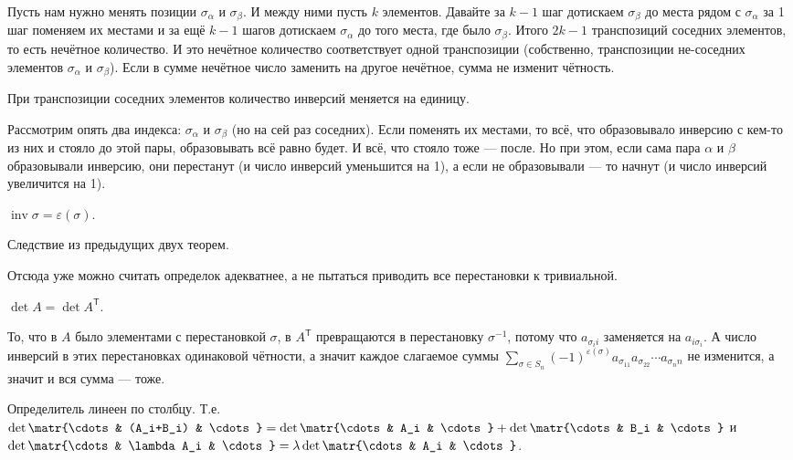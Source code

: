 \documentclass{article}
\newcommand*{\trans}{^{\mathsf T}}
\begin{document}
\begin{itemize}
        \begin{Proof}
            Пусть нам нужно менять позиции $\sigma_\alpha$ и $\sigma_\beta$. И между ними пусть $k$ элементов. Давайте за $k-1$ шаг дотискаем $\sigma_\beta$ до места рядом с $\sigma_\alpha$ за 1 шаг поменяем их местами и за ещё $k-1$ шагов дотискаем $\sigma_\alpha$ до того места, где было $\sigma_\beta$. Итого $2k-1$ транспозиций соседних элементов, то есть нечётное количество. И это нечётное количество соответствует одной транспозиции (собственно, транспозиции не-соседних элементов $\sigma_\alpha$ и $\sigma_\beta$). Если в сумме нечётное число заменить на другое нечётное, сумма не изменит чётность.
        \end{Proof}
        \thm При транспозиции соседних элементов количество инверсий меняется на единицу.
        \begin{Proof}
            Рассмотрим опять два индекса: $\sigma_\alpha$ и $\sigma_\beta$ (но на сей раз соседних). Если поменять их местами, то всё, что образовывало инверсию с кем-то из них и стояло до этой пары, образовывать всё равно будет. И всё, что стояло тоже --- после. Но при этом, если сама пара $\alpha$ и $\beta$ образовывали инверсию, они перестанут (и число инверсий уменьшится на 1), а если не образовывали --- то начнут (и число инверсий увеличится на 1).
        \end{Proof}
        \thm $\operatorname{inv}\sigma=\varepsilon(\sigma)$.
        \begin{Proof}
            Следствие из предыдущих двух теорем.
        \end{Proof}
        \begin{Comment}
            Отсюда уже можно считать определок адекватнее, а не пытаться приводить все перестановки к тривиальной.
        \end{Comment}
        \thm $\det A=\det A\trans$.
        \begin{Proof}
            То, что в $A$ было элементами с перестановкой $\sigma$, в $A\trans$ превращаются в перестановку $\sigma^{-1}$, потому что $a_{\sigma_ii}$ заменяется на $a_{i\sigma_i}$. А число инверсий в этих перестановках одинаковой чётности, а значит каждое слагаемое суммы $\sum\limits_{\sigma\in S_n}(-1)^{\varepsilon(\sigma)}a_{\sigma_11}a_{\sigma_22}\cdots a_{\sigma_nn}$ не изменится, а значит и вся сумма --- тоже.
        \end{Proof}
        \thm Определитель линеен по столбцу. Т.е. $\det\matr{\cdots & (A_i+B_i) & \cdots}=\det\matr{\cdots & A_i & \cdots}+\det\matr{\cdots & B_i & \cdots}$ и $\det\matr{\cdots & \lambda A_i & \cdots}=\lambda\det\matr{\cdots & A_i & \cdots}$.

\end{itemize}
\end{document}
